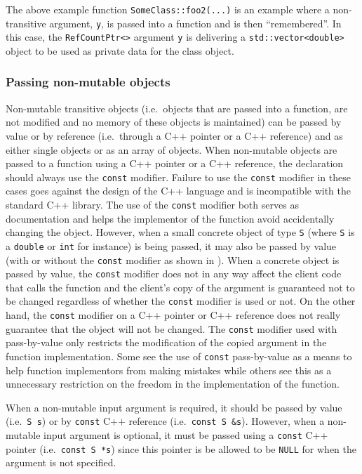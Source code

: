 {}\noindent{}The above example function
{}\texttt{SomeClass\-::foo2(...)} is an example where a non-transitive
argument, {}\texttt{y}, is passed into a function and is then
``remembered''.  In this case, the {}\texttt{Ref\-Count\-Ptr<>}
argument {}\texttt{y} is delivering a
{}\texttt{std\-::vector<\-double>} object to be used as private data
for the class object.

%
\subsubsection{Passing non-mutable objects}
%

Non-mutable transitive objects (i.e.~objects that are passed into a
function, are not modified and no memory of these objects is
maintained) can be passed by value or by reference (i.e.~through a C++
pointer or a C++ reference) and as either single objects or as an
array of objects.  When non-mutable objects are passed to a function
using a C++ pointer or a C++ reference, the declaration should always
use the {}\texttt{const} modifier.  Failure to use the
{}\texttt{const} modifier in these cases goes against the design of
the C++ language and is incompatible with the standard C++ library.
The use of the {}\texttt{const} modifier both serves as documentation
and helps the implementor of the function avoid accidentally changing
the object.  However, when a small concrete object of type
{}\texttt{S} (where {}\texttt{S} is a {}\texttt{double} or
{}\texttt{int} for instance) is being passed, it may also be passed by
value (with or without the {}\texttt{const} modifier as shown in
{}\cite[Appendix D]{ref:RefCountPtrBeginnersGuide}).  When a concrete
object is passed by value, the {}\texttt{const} modifier does not in
any way affect the client code that calls the function and the
client's copy of the argument is guaranteed not to be changed
regardless of whether the {}\texttt{const} modifier is used or not.
On the other hand, the {}\texttt{const} modifier on a C++ pointer or
C++ reference does not really guarantee that the object will not be
changed.  The {}\texttt{const} modifier used with pass-by-value only
restricts the modification of the copied argument in the function
implementation.  Some see the use of {}\texttt{const} pass-by-value as
a means to help function implementors from making mistakes while
others see this as a unnecessary restriction on the freedom in the
implementation of the function.

When a non-mutable input argument is required, it should be passed by
value (i.e.~{}\texttt{S s}) or by {}\texttt{const} C++ reference
(i.e.~{}\texttt{const S \&s}).  However, when a non-mutable input
argument is optional, it must be passed using a {}\texttt{const} C++
pointer (i.e.~{}\texttt{const S *s}) since this pointer is be allowed
to be {}\texttt{NULL} for when the argument is not specified.


